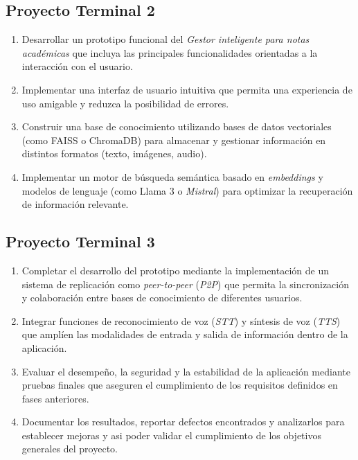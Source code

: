 \subsection*{Proyecto Terminal 2}

\begin{enumerate}

\item Desarrollar un prototipo funcional del \emph{Gestor inteligente para notas académicas} que incluya las principales funcionalidades orientadas a la interacción con el usuario.

\item Implementar una interfaz de usuario intuitiva que permita una experiencia de uso amigable y reduzca la posibilidad de errores.

\item Construir una base de conocimiento utilizando bases de datos vectoriales (como FAISS o ChromaDB) para almacenar y gestionar información en distintos formatos (texto, imágenes, audio).

\item Implementar un motor de búsqueda semántica basado en \textit{embeddings} y modelos de lenguaje (como Llama 3 o \textit{Mistral}) para optimizar la recuperación de información relevante.

\end{enumerate}

\subsection*{Proyecto Terminal 3}

\begin{enumerate}

\item Completar el desarrollo del prototipo mediante la implementación de un sistema de replicación como \textit{peer-to-peer} (\emph{P2P}) que permita la sincronización y colaboración entre bases de conocimiento de diferentes usuarios.

\item Integrar funciones de reconocimiento de voz (\emph{STT}) y síntesis de voz (\emph{TTS}) que amplíen las modalidades de entrada y salida de información dentro de la aplicación.

\item Evaluar el desempeño, la seguridad y la estabilidad de la aplicación mediante pruebas finales que aseguren el cumplimiento de los requisitos definidos en fases anteriores.

\item Documentar los resultados, reportar defectos encontrados y analizarlos para establecer mejoras y asi poder validar el cumplimiento de los objetivos generales del proyecto.

\end{enumerate}


